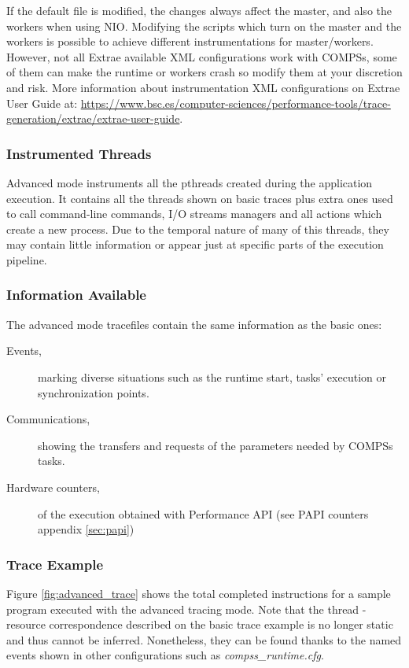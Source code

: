 If the default file is modified, the changes always affect the master, and also the workers when using NIO. Modifying the scripts which turn on the master and the workers is possible to achieve different instrumentations for master/workers. However, not all Extrae available XML configurations work with COMPSs,
some of them can make the runtime or workers crash so modify them at your discretion and risk. More information about instrumentation XML configurations
on Extrae User Guide at: 
\url{https://www.bsc.es/computer-sciences/performance-tools/trace-generation/extrae/extrae-user-guide}.


\subsubsection{Instrumented Threads}

Advanced mode instruments all the pthreads created during the application execution. It contains all the threads shown on basic traces plus extra ones used to
call command-line commands, I/O streams managers and all actions which create a new process. Due to the temporal nature of many of this threads, they may contain little information or appear just at specific parts of the execution pipeline.

\subsubsection{Information Available}

The advanced mode tracefiles contain the same information as the basic ones:


\begin{description}
 \item [Events,] marking diverse situations such as the runtime start, tasks' execution or synchronization points.
 \item [Communications,] showing the transfers and requests of the parameters needed by COMPSs tasks.
 \item [Hardware counters,] of the execution obtained with Performance API (see PAPI counters appendix \ref{sec:papi})
\end{description}


\subsubsection{Trace Example}

Figure \ref{fig:advanced_trace} shows the total completed instructions for a sample program executed with the advanced tracing mode. Note that the thread - resource correspondence described on the basic trace example is no longer static and thus cannot be inferred. Nonetheless, they can be found thanks to the named events shown in other configurations such as \textit{compss\_runtime.cfg}.


